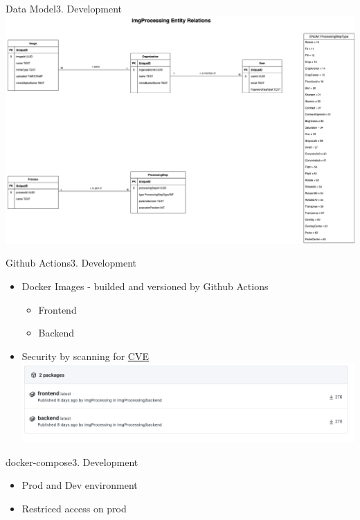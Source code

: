 \documentclass[aspectratio=169,20pt]{beamer}
\begin{document}
\begin{frame}{Data Model}{3. Development}
	\includegraphics[scale=0.45]{db_model}
\end{frame}

\begin{frame}{Github Actions}{3. Development}
	\begin{itemize}
		\item{Docker Images - builded and versioned by Github Actions}
		\begin{itemize}
			\item{Frontend}
			\item{Backend}
		\end{itemize}
		\item{Security by scanning for \href{https://github.com/marketplace/actions/container-image-scan/}{CVE}}
		\includegraphics[scale=0.8]{action}
	\end{itemize}
\end{frame}

\begin{frame}{docker-compose}{3. Development}
	\begin{itemize}
		\item{Prod and Dev environment}
		\item{Restriced access on prod}
	\end{itemize}
\end{frame}
\end{document}
